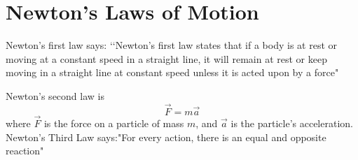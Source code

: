 \documentclass{article}
\begin{document}
\section{Newton’s Laws of Motion} 
Newton’s first law says: ‘‘Newton’s first law states that if a body is at rest or moving at a constant speed in a straight line, it will remain at rest or keep moving in a straight line at constant speed unless it is acted upon by a force"

Newton’s second law is 
\begin{equation} 
\vec F = m \vec a
\end{equation}
where $\vec F$ is the force on a particle of mass $m$, 
and $\vec a$ is the particle’s acceleration.
Newton's Third Law says:"For every action, there is an equal and opposite reaction"
\end{document}
